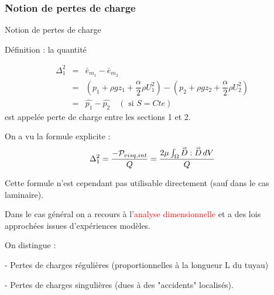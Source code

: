 \subsubsection{Notion de pertes de charge}
\begin{frame}{Notion de pertes de charge}

Définition : la quantité

\begin{eqnarray*}
\Delta _1^2 &=&  \bar{e}_{m_1} - \bar{e}_{m_2}  \\
               &=& (p_1 + \rho g z_1 
		+ \dfrac{\alpha}{2}\rho U_1^2) -(p_2 + \rho g z_2 
		+ \dfrac{\alpha}{2}\rho U_2^2) \\
	&=& \hat{p_1} - \hat{p_2} \quad (\mbox{ si } S=Cte)
\end{eqnarray*}
	est appelée perte de charge entre les sections 1 et 2.
	
	\medskip
	On a vu la formule explicite :
	$$
	\Delta _1^2 = \frac{-{\cal P}_{visq,int} }{Q} =  \frac{2\mu  \int_\Omega \accentset{\Rightarrow}{D} : \accentset{\Rightarrow}{D} \, dV}{Q}
	$$
	
	Cette formule n'est cependant pas utilisable directement (sauf dans le cas laminaire).
	
	\medskip

	Dans le cas général on a recours à l'\textcolor{red}{analyse dimensionnelle} et a des lois approchées issues d'expériences modèles.

\medskip
On distingue : 

-  Pertes de charges 	régulières (proportionnelles à la longueur L du tuyau) 

-  Pertes de charges singulières (dues à des "accidents" localisés).
	

\end{frame}
